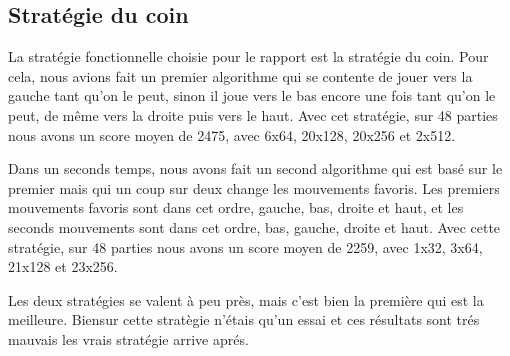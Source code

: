 \documentclass[12pt]{article}
\begin{document}
\subsection{Stratégie du coin}
La stratégie fonctionnelle choisie pour le rapport est la stratégie du coin.
Pour cela, nous avions fait un premier algorithme qui se contente de jouer vers
la gauche tant qu'on le peut, sinon il joue vers le bas encore une fois tant
qu'on le peut, de même vers la droite puis vers le haut. Avec cet stratégie, sur
48 parties nous avons un score moyen de 2475, avec 6x64, 20x128, 20x256 et
2x512.

Dans un seconds temps, nous avons fait un second algorithme qui est basé sur le
premier mais qui un coup sur deux change les mouvements favoris. Les premiers
mouvements favoris sont dans cet ordre, gauche, bas, droite et haut, et les
seconds mouvements sont dans cet ordre, bas, gauche, droite et haut. Avec cette
stratégie, sur 48 parties nous avons un score moyen de 2259, avec 1x32, 3x64,
21x128 et 23x256.

Les deux stratégies se valent à peu près, mais c'est bien la première qui est la
meilleure. Biensur cette stratègie n'étais qu'un essai et ces résultats sont trés mauvais
les vrais stratégie arrive aprés.
\end{document}
